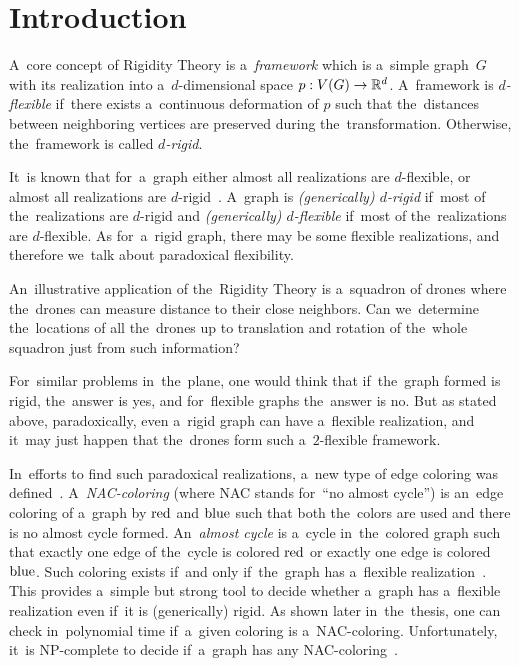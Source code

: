 
\chapter*{Introduction}
\setcounter{page}{1}


A~core concept of Rigidity Theory is a~\emph{framework} which is
a~simple graph~\(G\) with its realization
into a~\(d\)-dimensional space \(p: V(G) \to \mathbb{R}^d\).
A~framework is \emph{\( d \)-flexible} if~there exists
a~continuous deformation of \( p \) such that
the~distances between neighboring vertices are preserved during the~transformation.
Otherwise, the~framework is called \emph{\( d \)-rigid}.

It~is known that for~a~graph either almost all realizations are \( d \)-flexible,
or almost all realizations are \( d \)-rigid~\cite{generically_rigid_graphs}.
A~graph is \emph{(generically) \( d \)-rigid} if~most of the~realizations are \( d \)-rigid
and \emph{(generically) \( d \)-flexible} if~most of the~realizations are \( d \)-flexible.
%
As for~a~rigid graph,
there may be some flexible realizations,
and therefore we~talk about paradoxical flexibility.

An~illustrative application of the~Rigidity Theory is a~squadron of drones
where the~drones can measure distance to their close neighbors.
Can we~determine the~locations of all the~drones
up to translation and rotation of the~whole squadron
just from such information?

For~similar problems in~the~plane,
one would think that if~the~graph formed is rigid, the~answer is yes, and
for~flexible graphs the~answer is no.
But as stated above, paradoxically, even a~rigid graph can have a~flexible realization,
and it~may just happen that the~drones form such a~\( 2 \)-flexible framework.

In~efforts to find such paradoxical realizations,
a~new type of edge coloring was defined~\cite{legersky_original}.
A~\emph{NAC-coloring} (where NAC stands for~``no almost cycle'')
is an~edge coloring of a~graph by \( \text{red} \) and \( \text{blue} \)
such that both the~colors are used and there is no almost cycle formed.
An~\emph{almost cycle} is a~cycle in~the~colored graph such that exactly one
edge of the~cycle is colored \( \text{red} \) or exactly one edge is colored \( \text{blue} \).
Such coloring exists if~and only if~the~graph has a~flexible realization~\cite{legersky_original}.
This provides a~simple but strong tool to decide whether a~graph has
a~flexible realization even if~it is (generically) rigid.
As shown later in~the~thesis, one can check in~polynomial time
if~a~given coloring is a~NAC-coloring.
Unfortunately, it~is NP-complete to decide if~a~graph has any NAC-coloring~\cite{np_complete}.

